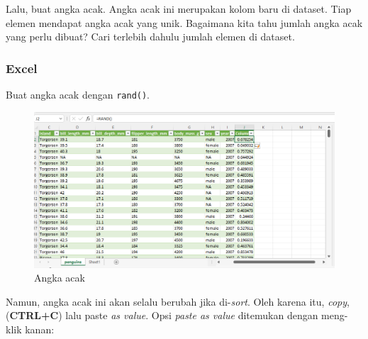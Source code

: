 \documentclass[
  letterpaper,
  DIV=11,
  numbers=noendperiod]{scrreprt}
\begin{document}
Lalu, buat angka acak. Angka acak ini merupakan kolom baru di dataset.
Tiap elemen mendapat angka acak yang unik. Bagaimana kita tahu jumlah
angka acak yang perlu dibuat? Cari terlebih dahulu jumlah elemen di
dataset.

\hypertarget{excel-2}{%
\subsubsection{Excel}\label{excel-2}}

Buat angka acak dengan \texttt{rand()}.

\begin{figure}

{\centering \includegraphics{./step1-genrand.png}

}

\caption{Angka acak}

\end{figure}

Namun, angka acak ini akan selalu berubah jika di-\emph{sort}. Oleh
karena itu, \emph{copy}, (\textbf{CTRL+C}) lalu paste \emph{as value}.
Opsi \emph{paste as value} ditemukan dengan meng-klik kanan:
\end{document}
